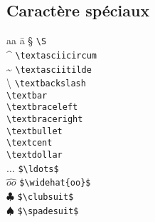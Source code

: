 \documentclass{article}
\newenvironment{tighttabbing}
  {\begingroup\setlength{\parskip}{0pt}\begin{tabbing}}
  {\end{tabbing}\endgroup}
\let\code\lstinline
\begin{document}
\begin{multicols*}{3}
\section*{Caractère spéciaux}
\begin{multicols*}{4}
\begin{tighttabbing}
    aa \= a \kill
    \S              \> \code+\S+              \\
    \textasciicircum \> \code+\textasciicircum+ \\
    \textasciitilde \> \code+\textasciitilde+ \\
    \textbackslash   \> \code+\textbackslash+   \\
    \textbar        \> \code+\textbar+        \\
    \textbraceleft   \> \code+\textbraceleft+   \\
    \textbraceright \> \code+\textbraceright+ \\
    \textbullet      \> \code+\textbullet+      \\
    \textcent       \> \code+\textcent+       \\
    \textdollar      \> \code+\textdollar+      \\
    $\ldots$        \> \code+$\ldots$+        \\
    $\widehat{oo}$   \> \code+$\widehat{oo}$+   \\
    $\clubsuit$     \> \code+$\clubsuit$+     \\
    $\spadesuit$     \> \code+$\spadesuit$+     \\
\end{tighttabbing}
\end{multicols*}



\end{multicols*}
\end{document}
